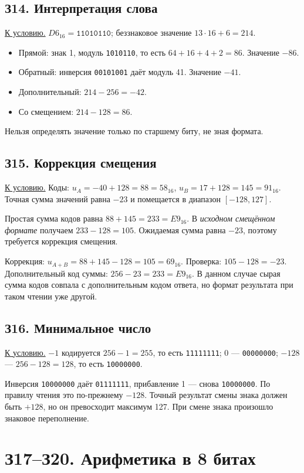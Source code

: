 \subsection*{З14. Интерпретация слова}\label{sol:z14}
\hyperref[task:z14]{К условию.}
$D6_{16}=\texttt{11010110}$; беззнаковое значение $13\cdot16+6=214$.
\begin{itemize}
    \item Прямой: знак 1, модуль \texttt{1010110}, то есть $64+16+4+2=86$. Значение $-86$.
    \item Обратный: инверсия \texttt{00101001} даёт модуль 41. Значение $-41$.
    \item Дополнительный: $214-256=-42$.
    \item Со смещением: $214-128=86$.
\end{itemize}
Нельзя определять значение только по старшему биту, не зная формата.

\subsection*{З15. Коррекция смещения}\label{sol:z15}
\hyperref[task:z15]{К условию.}
Коды: $u_A=-40+128=88=58_{16}$, $u_B=17+128=145=91_{16}$. Точная сумма значений равна $-23$ и помещается в диапазон $[-128,127]$.

Простая сумма кодов равна $88+145=233=E9_{16}$. В \emph{исходном смещённом формате} получаем $233-128=105$. Ожидаемая сумма равна $-23$, поэтому требуется коррекция смещения.

Коррекция: $u_{A+B}=88+145-128=105=69_{16}$.
Проверка: $105-128=-23$. Дополнительный код суммы: $256-23=233=E9_{16}$. В данном случае сырая сумма кодов совпала с дополнительным кодом ответа, но формат результата при таком чтении уже другой.

\subsection*{З16. Минимальное число}\label{sol:z16}
\hyperref[task:z16]{К условию.}
$-1$ кодируется $256-1=255$, то есть \texttt{11111111}; 0 --- \texttt{00000000}; $-128$ --- $256-128=128$, то есть \texttt{10000000}.

Инверсия \texttt{10000000} даёт \texttt{01111111}, прибавление 1 --- снова \texttt{10000000}. По правилу чтения это по-прежнему $-128$. Точный результат смены знака должен быть $+128$, но он превосходит максимум 127. При смене знака произошло знаковое переполнение.

\section{З17--З20. Арифметика в 8 битах}

